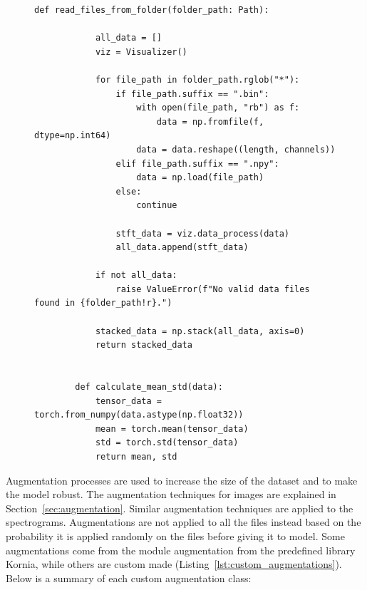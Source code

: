 \begin{figure}[htbp]
  \centering
  \begin{minipage}{\linewidth}
    \begin{lstlisting}[style=pythonstyle, caption={Reading data files and computing dataset statistics}, label=lst:data_reading_stats]
        def read_files_from_folder(folder_path: Path):

            all_data = []
            viz = Visualizer()
        
            for file_path in folder_path.rglob("*"):
                if file_path.suffix == ".bin":
                    with open(file_path, "rb") as f:
                        data = np.fromfile(f, dtype=np.int64)
                    data = data.reshape((length, channels))
                elif file_path.suffix == ".npy":
                    data = np.load(file_path)
                else:
                    continue
        
                stft_data = viz.data_process(data)
                all_data.append(stft_data)
        
            if not all_data:
                raise ValueError(f"No valid data files found in {folder_path!r}.")
        
            stacked_data = np.stack(all_data, axis=0)
            return stacked_data
        
        
        def calculate_mean_std(data):
            tensor_data = torch.from_numpy(data.astype(np.float32))
            mean = torch.mean(tensor_data)
            std = torch.std(tensor_data)
            return mean, std
    \end{lstlisting}
  \end{minipage}
\end{figure}
Augmentation processes are used to increase the size of the dataset and to make the model robust. The augmentation techniques for images are explained in Section~\ref{sec:augmentation}. Similar augmentation techniques are applied to the spectrograms. Augmentations are not applied to all the files instead based on the probability it is applied randomly on the files before giving it to model. Some augmentations come from the module augmentation from the predefined library Kornia, while others are custom made (Listing~\ref{lst:custom_augmentations}).  Below is a summary of each custom augmentation class:

